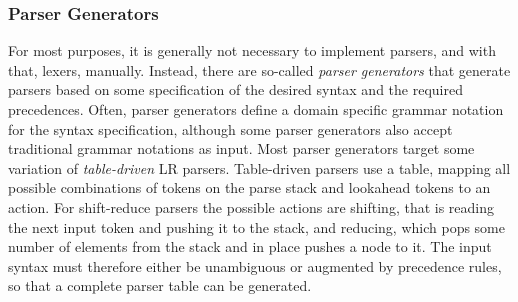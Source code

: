 \subsubsection{Parser Generators}\label{sec:parser_generators}

For most purposes, it is generally not necessary to implement parsers, and with that, lexers, manually.
Instead, there are so-called \emph{parser generators} that generate parsers based on some specification of the desired syntax and the required precedences.
Often, parser generators define a domain specific grammar notation for the syntax specification, although some parser generators also accept traditional grammar notations as input.
Most parser generators target some variation of \emph{table-driven} LR parsers.
Table-driven parsers use a table, mapping all possible combinations of tokens on the parse stack and lookahead tokens to an action.
For shift-reduce parsers the possible actions are shifting, that is reading the next input token and pushing it to the stack, and reducing, which pops some number of elements from the stack and in place pushes a node to it.
The input syntax must therefore either be unambiguous or augmented by precedence rules, so that a complete parser table can be generated.
